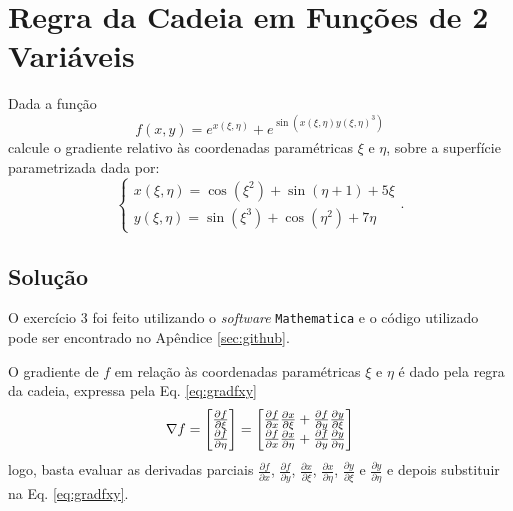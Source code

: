 \section{Regra da Cadeia em Fun\c{c}\~oes de 2 Vari\'aveis} 
Dada a fun\c{c}\~ao
\begin{equation*}
    f(x,y) = e^{x(\xi, \eta)} + e^{\sin(x(\xi, \eta) y(\xi, \eta)^3)}
\end{equation*}
calcule o gradiente relativo \`as coordenadas param\'etricas $\xi$ e $\eta$, sobre a superf\'icie parametrizada dada por:
\begin{equation*}
    \begin{cases}
        x(\xi, \eta) = \cos(\xi^2) + \sin(\eta + 1) + 5\xi \\
        y(\xi, \eta) = \sin(\xi^3) + \cos(\eta^2) + 7\eta
    \end{cases}.
\end{equation*}

\subsection{Solu\c{c}\~ao}
O exerc\'icio 3 foi feito utilizando o \textit{software} \texttt{Mathematica} e o c\'odigo utilizado pode ser encontrado no Ap\^endice \ref{sec:github}. 

O gradiente de $f$ em rela\c{c}\~ao \`as coordenadas param\'etricas $\xi$ e $\eta$ \'e dado pela regra da cadeia, expressa pela Eq. \eqref{eq:gradfxy}
\begin{equation}
    \label{eq:gradfxy}   
    \nabla f = \begin{bmatrix}
        \frac{\partial f}{\partial \xi} \\
        \frac{\partial f}{\partial \eta}
    \end{bmatrix} = 
    \begin{bmatrix}
        \frac{\partial f}{\partial x} \frac{\partial x}{\partial \xi} + \frac{\partial f}{\partial y} \frac{\partial y}{\partial \xi} \\
        \frac{\partial f}{\partial x} \frac{\partial x}{\partial \eta} + \frac{\partial f}{\partial y} \frac{\partial y}{\partial \eta}
    \end{bmatrix}
\end{equation}
logo, basta evaluar as derivadas parciais $\frac{\partial f}{\partial x}$, $\frac{\partial f}{\partial y}$, $\frac{\partial x}{\partial \xi}$, $\frac{\partial x}{\partial \eta}$, $\frac{\partial y}{\partial \xi}$ e $\frac{\partial y}{\partial \eta}$  e depois substituir na Eq. \eqref{eq:gradfxy}.

